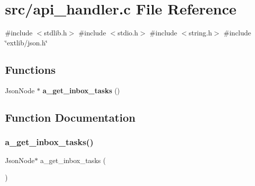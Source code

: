 \section{src/api\+\_\+handler.c File Reference}
\label{api__handler_8c}
{\ttfamily \#include $<$stdlib.\+h$>$}\newline
{\ttfamily \#include $<$stdio.\+h$>$}\newline
{\ttfamily \#include $<$string.\+h$>$}\newline
{\ttfamily \#include \char`\"{}extlib/json.\+h\char`\"{}}\newline
\subsection*{Functions}
\begin{DoxyCompactItemize}
\item 
Json\+Node $\ast$ \textbf{ a\+\_\+get\+\_\+inbox\+\_\+tasks} ()
\end{DoxyCompactItemize}


\subsection{Function Documentation}
\mbox{\label{api__handler_8c_aad3b42b9a6dfd0a86a95eca2363dab11}} 
\subsubsection{a\+\_\+get\+\_\+inbox\+\_\+tasks()}
{\footnotesize\ttfamily Json\+Node$\ast$ a\+\_\+get\+\_\+inbox\+\_\+tasks (\begin{DoxyParamCaption}{ }\end{DoxyParamCaption})}

